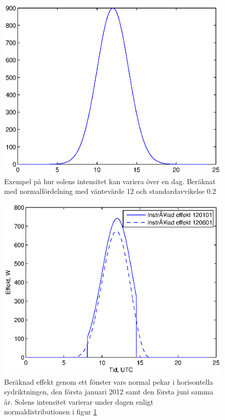 \begin{figure}[hpbt]
\centering
\includegraphics[scale=1]{images/normaldistribution.eps}
\caption{\label{fig:normal} Exempel på hur solens intensitet kan variera över en dag. Beräknat med normalfördelning med väntevärde 12 och standardavvikelse 0.2}
\end{figure}

\begin{figure}[hpbt]
\centering
\includegraphics[scale=1]{images/effekt0101and0601.eps}
\caption{\label{fig:effekt0101and0601} Beräknad effekt genom ett fönster vars normal pekar i horisontella sydriktningen, den första januari 2012 samt den första juni samma år. Solens intensitet varierar under dagen enligt normaldistributionen i figur \ref{fig:normal}}
\end{figure}
